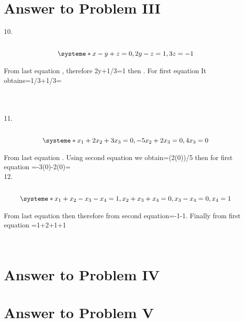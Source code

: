 \documentclass[11pt,a4paper]{article}
\begin{document}
\clearpage
\section{Answer to Problem III}\label{sec:P03}
10. \\
\\\[
\systeme*{x-y+z=0,2y-z=1,3z=-1}
\]
  
From last equation , therefore 2y+1/3=1 then . For first equation It obtains=1/3+1/3=\\
\\
\\
\\
11.\\
\\\[
\systeme*{x_1+2x_2+3x_3=0,-5x_2+2x_3=0,4x_3=0}
\]

From last equation . Using second equation we obtain=(2(0))/5 then for first equation =-3(0)-2(0)=
\\12. \\
\\\[
\systeme*{x_1+x_2-x_3-x_4=1,x_2+x_3+x_4=0,x_3-x_4=0,x_4=1}
\]

From last equation  then  therefore from second equation=-1-1. Finally from first equation =1+2+1+1\\


\begin{doublespace}
\noindent\(\pmb{\text{}}\)
\end{doublespace}


\clearpage
\section{Answer to Problem IV}\label{sec:P04}



\clearpage
\section{Answer to Problem V}\label{sec:P05}
\end{document}
